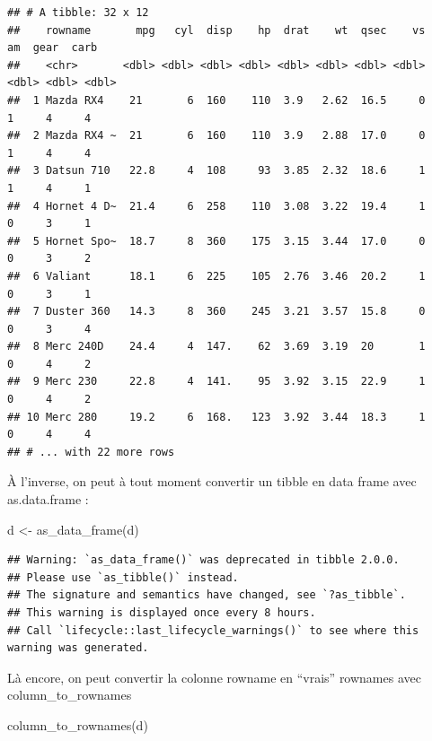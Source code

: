 \documentclass[
]{book}
\newenvironment{Shaded}{\begin{snugshade}}{\end{snugshade}}
\newcommand{\FunctionTok}[1]{\textcolor[rgb]{0.00,0.00,0.00}{#1}}
\newcommand{\NormalTok}[1]{#1}
\newcommand{\OtherTok}[1]{\textcolor[rgb]{0.56,0.35,0.01}{#1}}
\begin{document}
\begin{verbatim}
## # A tibble: 32 x 12
##    rowname       mpg   cyl  disp    hp  drat    wt  qsec    vs    am  gear  carb
##    <chr>       <dbl> <dbl> <dbl> <dbl> <dbl> <dbl> <dbl> <dbl> <dbl> <dbl> <dbl>
##  1 Mazda RX4    21       6  160    110  3.9   2.62  16.5     0     1     4     4
##  2 Mazda RX4 ~  21       6  160    110  3.9   2.88  17.0     0     1     4     4
##  3 Datsun 710   22.8     4  108     93  3.85  2.32  18.6     1     1     4     1
##  4 Hornet 4 D~  21.4     6  258    110  3.08  3.22  19.4     1     0     3     1
##  5 Hornet Spo~  18.7     8  360    175  3.15  3.44  17.0     0     0     3     2
##  6 Valiant      18.1     6  225    105  2.76  3.46  20.2     1     0     3     1
##  7 Duster 360   14.3     8  360    245  3.21  3.57  15.8     0     0     3     4
##  8 Merc 240D    24.4     4  147.    62  3.69  3.19  20       1     0     4     2
##  9 Merc 230     22.8     4  141.    95  3.92  3.15  22.9     1     0     4     2
## 10 Merc 280     19.2     6  168.   123  3.92  3.44  18.3     1     0     4     4
## # ... with 22 more rows
\end{verbatim}

À l'inverse, on peut à tout moment convertir un tibble en data frame avec as.data.frame :

\begin{Shaded}
\begin{Highlighting}[]
\NormalTok{d }\OtherTok{\textless{}{-}} \FunctionTok{as\_data\_frame}\NormalTok{(d)}
\end{Highlighting}
\end{Shaded}

\begin{verbatim}
## Warning: `as_data_frame()` was deprecated in tibble 2.0.0.
## Please use `as_tibble()` instead.
## The signature and semantics have changed, see `?as_tibble`.
## This warning is displayed once every 8 hours.
## Call `lifecycle::last_lifecycle_warnings()` to see where this warning was generated.
\end{verbatim}

Là encore, on peut convertir la colonne rowname en ``vrais'' rownames avec column\_to\_rownames

\begin{Shaded}
\begin{Highlighting}[]
\FunctionTok{column\_to\_rownames}\NormalTok{(d)}
\end{Highlighting}
\end{Shaded}
\end{document}
